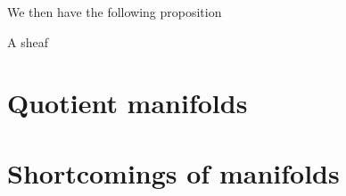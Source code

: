 \documentclass[../main.tex]{subfiles}
\begin{document}
We then have the following proposition

\begin{prop}
    A sheaf 
\end{prop}

\section{Quotient manifolds}

\section{Shortcomings of manifolds}
\end{document}
